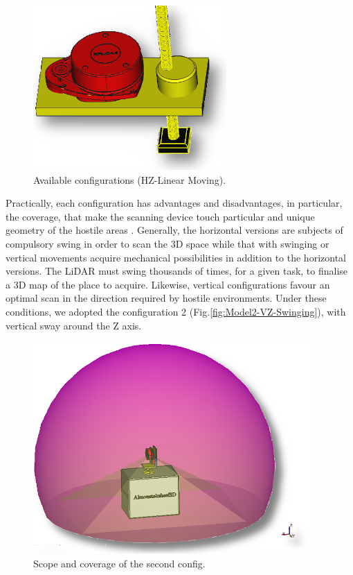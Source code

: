 \documentclass[Afour,sageh,times]{sagej}
\begin{document}
\begin{figure}
    \centering
    \includegraphics[scale=2]{model4.png}
    \caption{Available configurations (HZ-Linear Moving).}
    \label{fig:Model4-HZ-LinearMoving}
\end{figure}

Practically, each configuration has advantages and disadvantages, in particular, the coverage, that make the scanning device touch particular and unique geometry of the hostile areas \citep{Kaminaga2016}. Generally, the horizontal versions are subjects of compulsory swing in order to scan the 3D space while that with swinging or vertical movements acquire mechanical possibilities in addition to the horizontal versions.
The LiDAR must swing thousands of times, for a given task, to finalise a 3D map of the place to acquire.
Likewise, vertical configurations favour an optimal scan in the direction required by hostile environments.
Under these conditions, we adopted the configuration 2 (Fig.\ref{fig:Model2-VZ-Swinging}), with vertical sway around the Z axis.

\begin{figure}
    \centering
    \includegraphics[scale=1.5]{limit2.png}
    \caption{Scope and coverage of the second config.}
    \label{fig:Limitationofthesecondconfig}
\end{figure}
\end{document}
